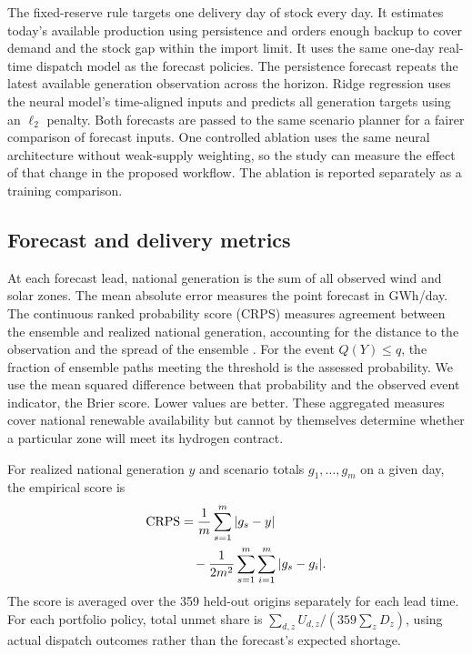 The fixed-reserve rule targets one delivery day of stock every day. It estimates today's available production using persistence and orders enough backup to cover demand and the stock gap within the import limit. It uses the same one-day real-time dispatch model as the forecast policies. The persistence forecast repeats the latest available generation observation across the horizon. Ridge regression uses the neural model's time-aligned inputs and predicts all generation targets using an $\ell_2$ penalty. Both forecasts are passed to the same scenario planner for a fairer comparison of forecast inputs. One controlled ablation uses the same neural architecture without weak-supply weighting, so the study can measure the effect of that change in the proposed workflow. The ablation is reported separately as a training comparison.

\subsection{Forecast and delivery metrics}
At each forecast lead, national generation is the sum of all observed wind and solar zones. The mean absolute error measures the point forecast in GWh/day. The continuous ranked probability score (CRPS) measures agreement between the ensemble and realized national generation, accounting for the distance to the observation and the spread of the ensemble \citep{gneiting2007}. For the event $Q(Y)\le q$, the fraction of ensemble paths meeting the threshold is the assessed probability. We use the mean squared difference between that probability and the observed event indicator, the Brier score. Lower values are better. These aggregated measures cover national renewable availability but cannot by themselves determine whether a particular zone will meet its hydrogen contract.

For realized national generation $y$ and scenario totals $g_1,\ldots,g_m$ on a given day, the empirical score is
\begin{equation}
\begin{aligned}
\operatorname{CRPS} &= \frac1m\sum_{s=1}^m|g_s-y| \\
      &\quad-\frac{1}{2m^2}\sum_{s=1}^m\sum_{i=1}^{m}|g_s-g_i|.
\end{aligned}
\end{equation}
The score is averaged over the 359 held-out origins separately for each lead time. For each portfolio policy, total unmet share is $\sum_{d,z}U_{d,z}/(359\sum_z D_z)$, using actual dispatch outcomes rather than the forecast's expected shortage.


